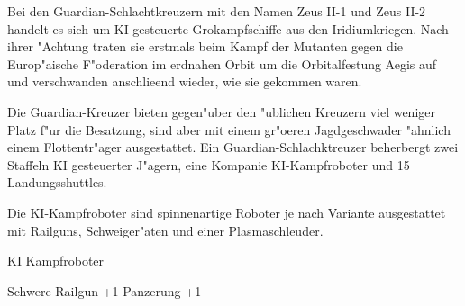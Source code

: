 
Bei den Guardian-Schlachtkreuzern mit den Namen Zeus II-1 und Zeus II-2 handelt es sich um KI gesteuerte Gro\3kampfschiffe aus den Iridiumkriegen. Nach ihrer "Achtung traten sie erstmals beim Kampf der Mutanten gegen die Europ"aische F"oderation im erdnahen Orbit um die Orbitalfestung Aegis auf und verschwanden anschlie\3end wieder, wie sie gekommen waren.

Die Guardian-Kreuzer bieten gegen"uber den "ublichen Kreuzern viel weniger Platz f"ur die Besatzung, sind aber mit einem gr"o\3eren Jagdgeschwader "ahnlich einem Flottentr"ager ausgestattet. Ein Guardian-Schlachktreuzer beherbergt zwei Staffeln KI gesteuerter J"agern, eine Kompanie KI-Kampfroboter und 15 Landungsshuttles.

Die KI-Kampfroboter sind spinnenartige Roboter je nach Variante ausgestattet mit Railguns, Schwei\3ger"aten und einer Plasmaschleuder.

\begin{nscsheet}[f]{KI Kampfroboter}
    \nscstats[ATT=3,AGG=3,CON=2]
    \nscruler
    \begin{nscinventory}
        \nscitem[Waffen] Schwere Railgun +1
        \nscitem[R"ustung] Panzerung +1
    \end{nscinventory}
\end{nscsheet}
